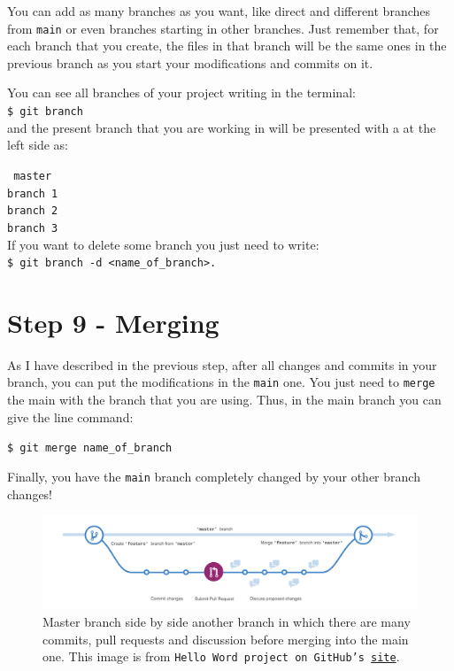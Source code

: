 \documentclass[12pt,a4paper,titlepage,brazil]{article}
\begin{document}
{You can add as many branches as you want, like direct and different branches from \texttt{main} or even branches starting in other branches. Just remember that, for each branch that you create, the files in that branch will be the same ones in the previous branch as you start your modifications and commits on it.

You can see all branches of your project writing in the terminal:\\

\texttt{\$ git branch}\\

and the present branch that you are working in will be presented with a \* at the left side as:

\texttt{\* master}\\

\texttt{branch 1}\\

\texttt{branch 2}\\

\texttt{branch 3}\\

If you want to delete some branch you just need to write:\\

\texttt{\$ git branch -d <name\_of\_branch>.}


\section{Step 9 - Merging}

As I have described in the previous step, after all changes and commits in your branch, you can put the modifications in the \texttt{main} one. You just need to \texttt{merge} the main with the branch that you are using. Thus, in the main branch you can give the line command:

\texttt{\$ git merge name\_of\_branch}

Finally, you have the \texttt{main} branch completely changed by your other branch changes!

\begin{figure}[h!]
 \centering 
 \includegraphics[scale=0.24]{branching.png}
 \caption{Master branch side by side another branch in which there are many commits, pull requests and discussion before merging into the main one. This image is from \texttt{Hello Word project on GitHub's \href{https://guides.github.com/activities/hello-world/branching.png}{site}}.}
\end{figure}

}
\end{document}
